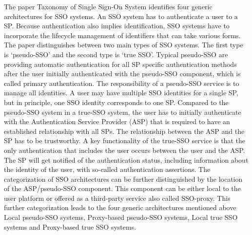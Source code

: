 {{The paper Taxonomy of Single Sign-On System \cite{Pashalidis:2003:10.1007/3-540-45067-X_22} identifies four generic architectures for SSO systems. An SSO system has to authenticate a user to a SP. Because authentication also implies identification, SSO systems have to incorporate the lifecycle management of identifiers that can take various forms. The paper distinguishes between two main types of SSO systems. The first type is ‘pseudo-SSO’ and the second type is ‘true SSO’. Typical pseudo-SSO are providing automatic authentication for all SP specific authentication methods after the user initially authenticated with the pseudo-SSO component, which is called primary authentication. The responsibility of a pseudo-SSO service is to manage all identities. A user may have multiple SSO identities for a single SP, but in principle, one SSO identity corresponds to one SP. Compared to the pseudo-SSO system in a true-SSO system, the user has to initially authenticate with the Authentication Service Provider (ASP) that is required to have an established relationship with all SPs. The relationship between the ASP and the SP has to be trustworthy. A key functionality of the true-SSO service is that the only authentication that includes the user occurs between the user and the ASP. The SP will get notified of the authentication status, including information about the identity of the user, with so-called authentication assertions. The categorization of SSO architectures can be further distinguished by the location of the ASP/pseudo-SSO component. This component can be either local to the user platform or offered as a third-party service also called SSO-proxy. This further categorization leads \cite{Pashalidis:2003:10.1007/3-540-45067-X_22} to the four generic architectures mentioned above Local pseudo-SSO systems, Proxy-based pseudo-SSO systems, Local true SSO systems and Proxy-based true SSO systems.

}}
